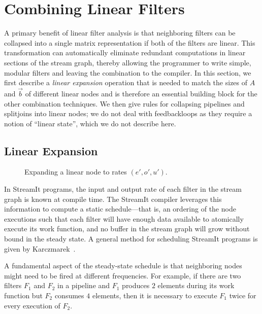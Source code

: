 \section{Combining Linear Filters}
\label{sec:combine}

A primary benefit of linear filter analysis is that neighboring
filters can be collapsed into a single matrix representation if both
of the filters are linear.  This transformation can automatically
eliminate redundant computations in linear sections of the stream
graph, thereby allowing the programmer to write simple, modular
filters and leaving the combination to the compiler.  In this section,
we first describe a {\it linear expansion} operation that is needed to
match the sizes of $A$ and $\vec{b}$ of different linear nodes and is
therefore an essential building block for the other combination
techniques.  We then give rules for collapsing pipelines and
splitjoins into linear nodes; we do not deal with feedbackloops as
they require a notion of ``linear state'', which we do not describe
here.

\subsection{Linear Expansion}

\begin{figure}[t]
\center
\vspace{-12pt}
\epsfxsize=3.2in
\vspace{-12pt}
\caption{Expanding a linear node to rates $(e', o', u')$.  }
\label{fig:expanding-a-matrix}
\vspace{-12pt}
\end{figure}

In StreamIt programs, the input and output rate of each filter in the
stream graph is known at compile time.  The StreamIt compiler
leverages this information to compute a static schedule---that is, an
ordering of the node executions such that each filter will have enough
data available to atomically execute its work function, and no
buffer in the stream graph will grow without bound in the steady
state.  A general method for scheduling StreamIt programs is given by
Karczmarek~\cite{karczma-thesis}.

A fundamental aspect of the steady-state schedule is that neighboring
nodes might need to be fired at different frequencies.  For example,
if there are two filters $F_1$ and $F_2$ in a pipeline and
$F_1$ produces $2$ elements during its work function but $F_2$
consumes $4$ elements, then it is necessary to execute $F_1$ twice for
every execution of $F_2$.

